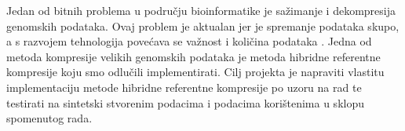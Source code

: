 Jedan od bitnih problema u području bioinformatike je sažimanje i dekompresija genomskih podataka. Ovaj problem je aktualan jer je spremanje podataka skupo, a s razvojem tehnologija povećava se važnost i količina podataka \cite{compressbigdata}. Jedna od metoda kompresije velikih genomskih podataka je metoda hibridne referentne kompresije koju smo odlučili implementirati. Cilj projekta je napraviti vlastitu implementaciju metode hibridne referentne kompresije po uzoru na rad \citep{hrcm} te testirati na sintetski stvorenim podacima i podacima korištenima u sklopu spomenutog rada.